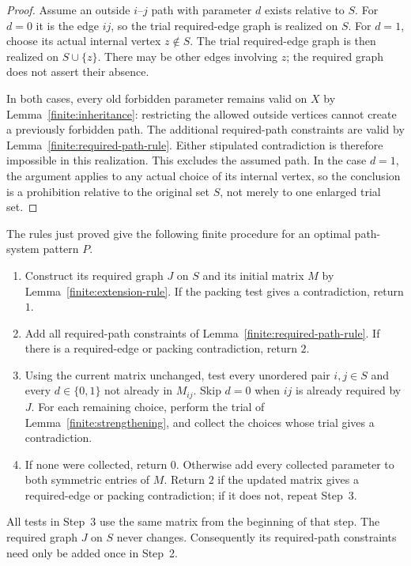 \begin{proof}
Assume an outside $i$--$j$ path with parameter $d$ exists relative to
$S$.  For $d=0$ it is the edge $ij$, so the trial required-edge graph
is realized on $S$.
For $d=1$, choose its actual internal vertex $z\notin S$.
The trial required-edge graph is then realized on $S\cup\{z\}$.
There may be other edges involving $z$; the required graph does not
assert their absence.

In both cases, every old forbidden parameter remains valid on $X$
by Lemma~\ref{finite:inheritance}: restricting the allowed outside
vertices cannot create a previously forbidden path.
The additional required-path constraints are valid by
Lemma~\ref{finite:required-path-rule}.
Either stipulated contradiction is therefore impossible in this
realization.  This excludes the assumed path.
In the case $d=1$, the argument applies to any actual choice of its
internal vertex, so the conclusion is a prohibition relative to the
original set $S$, not merely to one enlarged trial set.
\end{proof}

The rules just proved give the following finite procedure for an
optimal path-system pattern $P$.
\begin{enumerate}
\item Construct its required graph $J$ on $S$ and its initial matrix
$M$ by Lemma~\ref{finite:extension-rule}.  If the packing test gives a
contradiction, return $1$.
\item Add all required-path constraints of
Lemma~\ref{finite:required-path-rule}.  If there is a required-edge or
packing contradiction, return $2$.
\item Using the current matrix unchanged, test every unordered pair
$i,j\in S$ and every $d\in\{0,1\}$ not already in $M_{ij}$.
Skip $d=0$ when $ij$ is already required by $J$.
For each remaining choice, perform the trial of
Lemma~\ref{finite:strengthening}, and collect the choices whose trial
gives a contradiction.
\item If none were collected, return $0$.
Otherwise add every collected parameter to both symmetric entries of
$M$.  Return $2$ if the updated matrix gives a required-edge or packing
contradiction; if it does not, repeat Step~3.
\end{enumerate}
All tests in Step~3 use the same matrix from the beginning of that
step.  The required graph $J$ on $S$ never changes.  Consequently its
required-path constraints need only be added once in Step~2.

